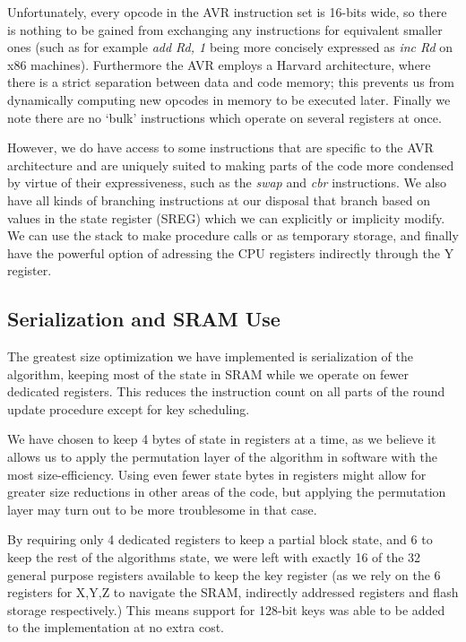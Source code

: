 \documentclass[11pt]{llncs2e} %
\begin{document}
Unfortunately, every opcode in the AVR instruction set is 16-bits wide, so there is nothing to be gained from exchanging any instructions for equivalent smaller ones (such as for example \textit{add Rd, 1} being more concisely expressed as \textit{inc Rd} on x86 machines).
Furthermore the AVR employs a Harvard architecture, where there is a strict separation between data and code memory; this prevents us from dynamically computing new opcodes in memory to be executed later.
Finally we note there are no `bulk' instructions which operate on several registers at once.

However, we do have access to some instructions that are specific to the AVR architecture and are uniquely suited to making parts of the code more condensed by virtue of their expressiveness, such as the \textit{swap} and \textit{cbr} instructions.
We also have all kinds of branching instructions at our disposal that branch based on values in the state register (SREG) which we can explicitly or implicity modify.
We can use the stack to make procedure calls or as temporary storage, and finally have the powerful option of adressing the CPU registers indirectly through the Y register.

\subsection{Serialization and SRAM Use}
The greatest size optimization we have implemented is serialization of the algorithm, keeping most of the state in SRAM while we operate on fewer dedicated registers.
This reduces the instruction count on all parts of the round update procedure except for key scheduling.

We have chosen to keep 4 bytes of state in registers at a time, as we believe it allows us to apply the permutation layer of the algorithm in software with the most size-efficiency.
Using even fewer state bytes in registers might allow for greater size reductions in other areas of the code, but applying the permutation layer may turn out to be more troublesome in that case.

By requiring only 4 dedicated registers to keep a partial block state, and 6 to keep the rest of the algorithms state, we were left with exactly 16 of the 32 general purpose registers available to keep the key register (as we rely on the 6 registers for X,Y,Z to navigate the SRAM, indirectly addressed registers and flash storage respectively.)
This means support for 128-bit keys was able to be added to the implementation at no extra cost.
\end{document}
